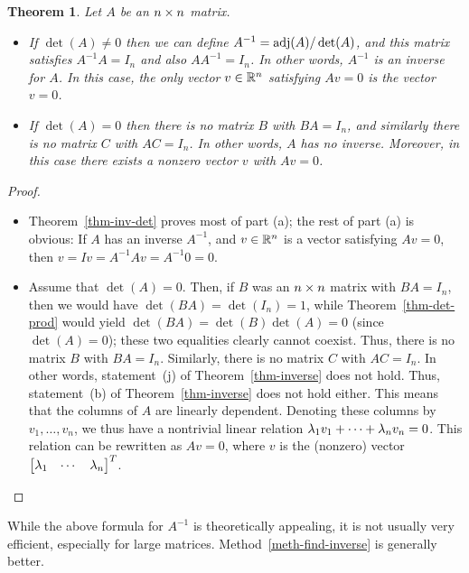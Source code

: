\documentclass[reqno]{amsart}
\newtheorem{theorem}{Theorem}[section]
\theoremstyle{definition}
\begin{document}
\begin{theorem}\label{thm-inv-det-pre}
 Let $A$ be an $n\times n$ matrix.  
 \begin{itemize}
  \item[(a)] If $\det(A)\neq 0$ then we can define
   $A^{-1}=\operatorname{adj}(A)/\det(A)$, and this matrix satisfies $A^{-1}A=I_n$
   and also $AA^{-1}=I_n$.  In other words, $A^{-1}$ is an inverse for
   $A$.  In this case, the only vector $v\in{\mathbb{R}}^n$ satisfying $Av=0$ is
   the vector $v=0$.
  \item[(b)] If $\det(A)=0$ then there is no matrix $B$ with $BA=I_n$,
   and similarly there is no matrix $C$ with $AC=I_n$.  In other
   words, $A$ has no inverse.  Moreover, in this case there exists a
   nonzero vector $v$ with $Av=0$.
 \end{itemize}
\end{theorem}
\begin{proof}
\begin{itemize}
\item[(a)]
 Theorem~\ref{thm-inv-det} proves most of part (a);
 the rest of part (a) is obvious:
 If $A$ has an inverse $A^{-1}$, and $v\in{\mathbb{R}}^n$ is a vector satisfying
 $Av = 0$, then $v = Iv = A^{-1}Av = A^{-1}0 = 0$.

\item[(b)]
 Assume that $\det(A)=0$.
 Then, if $B$ was an $n\times n$ matrix with $BA=I_n$,
 then we would have $\det(BA) = \det(I_n) = 1$,
 while Theorem~\ref{thm-det-prod} would yield
 $\det(BA) = \det(B) \det(A) = 0$ (since $\det(A) = 0$);
 these two equalities clearly cannot coexist.
 Thus, there is no matrix $B$ with $BA = I_n$.
 Similarly, there is no matrix $C$ with $AC = I_n$.
 In other words, statement~(j) of Theorem~\ref{thm-inverse}
 does not hold.
 Thus, statement~(b) of Theorem~\ref{thm-inverse} does
 not hold either.
 This means that the columns of $A$ are linearly dependent.
 Denoting these columns by $v_1, \dotsc, v_n$,
 we thus have a nontrivial linear relation
 $\lambda_1 v_1 + \cdots + \lambda_n v_n = 0$.
 This relation can be rewritten as $Av = 0$,
 where $v$ is the (nonzero) vector
 $\begin{bmatrix} \lambda_1 & \cdots & \lambda_n \end{bmatrix}^T$.
\end{itemize}
\end{proof}

While the above formula for $A^{-1}$ is theoretically appealing,
it is not usually very efficient, especially for large matrices.
Method~\ref{meth-find-inverse} is generally better.
\end{document}
